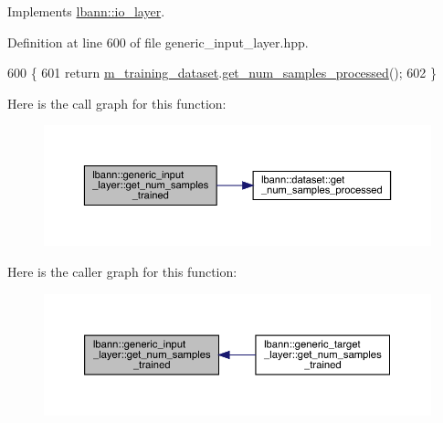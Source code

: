 Implements \hyperlink{classlbann_1_1io__layer_ad25bf7559a27065c39d0c1d2f849347f}{lbann\+::io\+\_\+layer}.



Definition at line 600 of file generic\+\_\+input\+\_\+layer.\+hpp.


\begin{DoxyCode}
600                                                 \{
601     \textcolor{keywordflow}{return} \hyperlink{classlbann_1_1generic__input__layer_a23716635b1062bfe57f7fcf75140a63a}{m\_training\_dataset}.\hyperlink{classlbann_1_1dataset_a73496347a477a5ebb0dbf30140295026}{get\_num\_samples\_processed}();
602   \}
\end{DoxyCode}
Here is the call graph for this function\+:\nopagebreak
\begin{figure}[H]
\begin{center}
\leavevmode
\includegraphics[width=350pt]{classlbann_1_1generic__input__layer_a95a7a5ad2a6089ffb9197632015e6062_cgraph}
\end{center}
\end{figure}
Here is the caller graph for this function\+:\nopagebreak
\begin{figure}[H]
\begin{center}
\leavevmode
\includegraphics[width=350pt]{classlbann_1_1generic__input__layer_a95a7a5ad2a6089ffb9197632015e6062_icgraph}
\end{center}
\end{figure}
\mbox{\label{classlbann_1_1generic__input__layer_a749741781204b17c8ca172a9a405a90e}} 
